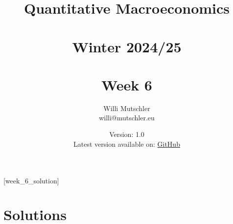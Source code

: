 
\newif\ifDisplaySolutions\DisplaySolutionstrue%


\title{Quantitative Macroeconomics\\~\\Winter 2024/25\\~\\Week 6}
\author{Willi Mutschler\\willi@mutschler.eu}
\date{Version: 1.0\\Latest version available on: \href{https://github.com/wmutschl/Quantitative-Macroeconomics/releases/latest/download/week_6.pdf}{GitHub}}
\maketitle\thispagestyle{empty}

\newpage
{}[week_6_solution]
\tableofcontents\thispagestyle{empty}\newpage

\setcounter{page}{1}
\newpage
\newpage
\newpage
\printbibliography%
\newpage

\ifDisplaySolutions%
\newpage
\appendix
\section{Solutions}

\fi
